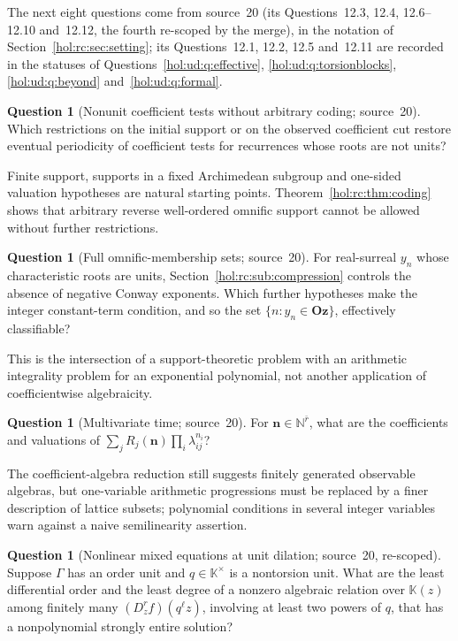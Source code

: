 \documentclass[11pt]{article}
\numberwithin{equation}{section}
\theoremstyle{definition}
\newtheorem{question}[theorem]{Question}
\theoremstyle{remark}
\newcommand{\N}{\mathbb N}
\newcommand{\KK}{\mathbb K}
\newcommand{\Oz}{\mathbf{Oz}}
\begin{document}
The next eight questions come from source~20 (its Questions~12.3, 12.4,
12.6--12.10 and~12.12, the fourth re-scoped by the merge), in the notation of
Section~\ref{hol:rc:sec:setting}; its Questions~12.1, 12.2, 12.5 and~12.11 are
recorded in the statuses of Questions~\ref{hol:ud:q:effective},
\ref{hol:ud:q:torsionblocks}, \ref{hol:ud:q:beyond} and~\ref{hol:ud:q:formal}.

\begin{question}[Nonunit coefficient tests without arbitrary coding;
source~20]\label{hol:rc:q:nonunit}
Which restrictions on the initial support or on the observed coefficient cut
restore eventual periodicity of coefficient tests for recurrences whose roots
are not units?
\end{question}

Finite support, supports in a fixed Archimedean subgroup and one-sided
valuation hypotheses are natural starting points.
Theorem~\ref{hol:rc:thm:coding} shows that arbitrary reverse well-ordered
omnific support cannot be allowed without further restrictions.

\begin{question}[Full omnific-membership sets; source~20]
\label{hol:rc:q:membership}
For real-surreal $y_n$ whose characteristic roots are units,
Section~\ref{hol:rc:sub:compression} controls the absence of negative Conway
exponents. Which further hypotheses make the integer constant-term condition,
and so the set $\{n:y_n\in\Oz\}$, effectively classifiable?
\end{question}

This is the intersection of a support-theoretic problem with an arithmetic
integrality problem for an exponential polynomial, not another application of
coefficientwise algebraicity.

\begin{question}[Multivariate time; source~20]\label{hol:rc:q:multivariate}
For $\mathbf n\in\N^{\bar r}$, what are the coefficients and valuations of
$\sum_jR_j(\mathbf n)\prod_i\lambda_{ij}^{n_i}$?
\end{question}

The coefficient-algebra reduction still suggests finitely generated
observable algebras, but one-variable arithmetic progressions must be replaced
by a finer description of lattice subsets; polynomial conditions in several
integer variables warn against a naive semilinearity assertion.

\begin{question}[Nonlinear mixed equations at unit dilation; source~20,
re-scoped]\label{hol:rc:q:nonlinear}
Suppose $\Gamma$ has an order unit and $q\in\KK^\times$ is a nontorsion unit.
What are the least differential order and the least degree of a nonzero
algebraic relation over $\KK(z)$ among finitely many $(D_z^rf)(q^\ell z)$,
involving at least two powers of $q$, that has a nonpolynomial strongly entire
solution?
\end{question}
\end{document}
